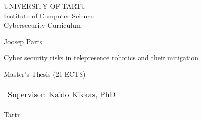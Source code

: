 
\thispagestyle{empty}
\begin{center}

\large
UNIVERSITY OF TARTU\\
Institute of Computer Science\\
Cybersecurity Curriculum\\

\vspace{45mm}

\Large Joosep Parts

\vspace{4mm}

\huge Cyber security risks in telepresence robotics and their mitigation

\vspace{20mm}

\Large Master's Thesis (21 ECTS)

\end{center}

\vspace{2mm}

\begin{flushright}
 {
 \setlength{\extrarowheight}{5pt}
 \begin{tabular}{r l} 
  \sffamily Supervisor: Kaido Kikkas, PhD
 \end{tabular}
 }
\end{flushright}


\vfill
\centerline{\large Tartu \the\year}

